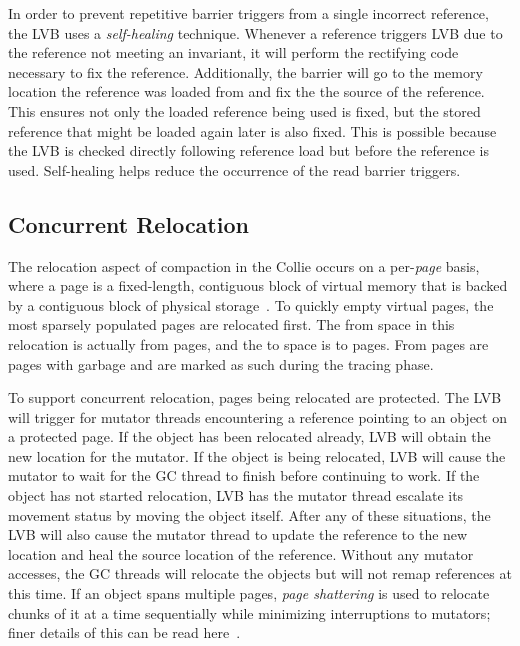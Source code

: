 \documentclass{sig-alternate}
\begin{document}
In order to prevent repetitive barrier triggers from a single incorrect reference,
the LVB uses a \emph{self-healing} technique. Whenever a reference triggers LVB
due to the reference not meeting an invariant, it will perform the rectifying code
necessary to fix the reference. Additionally, the barrier will go to the memory
location the reference was loaded from and fix the the source of the reference. This
ensures not only the loaded reference being used is fixed, but the stored reference
that might be loaded again later is also fixed. This is possible because the LVB 
is checked directly following reference load but before the reference is used.
Self-healing helps reduce the occurrence of the read barrier triggers.


\subsection{Concurrent Relocation}
\label{sec:c4Relocation}

The relocation aspect of compaction in the Collie occurs on a per-\emph{page}
basis, where a page is a fixed-length, contiguous block of virtual memory
that is backed by a contiguous block of physical storage~\cite{wiki:page}\cite{Tene:C4}.
To quickly empty virtual pages, the most sparsely populated pages are relocated
first. The from space in this relocation is actually from pages, and the to space
is to pages. From pages are pages with garbage
and are marked as such during the tracing phase.

To support concurrent relocation, pages being relocated are protected. 
The LVB will trigger for mutator threads encountering a reference pointing to an object
on a protected page. If the object has been relocated already, LVB will
obtain the new location for the mutator. If the object is being relocated, 
LVB will cause the mutator to wait
for the GC thread to finish before continuing to work.
If the object has not started relocation, LVB has the mutator thread 
escalate its movement status by moving the object itself. After any of 
these situations, the LVB will also cause the mutator thread to update 
the reference to the new location and heal the source location of the reference.
Without any mutator accesses, the GC threads will relocate the objects but
will not remap references at this time. If an object
spans multiple pages, \emph{page shattering} is used to relocate chunks of
it at a time sequentially while minimizing interruptions to mutators;
finer details of this can be read here~\cite{Tene:C4}.
\end{document}
